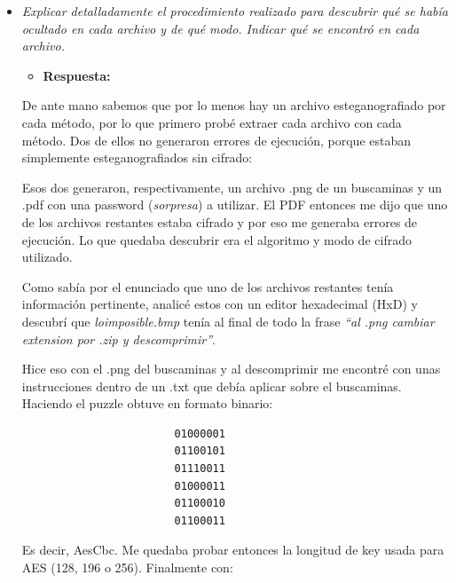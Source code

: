 \documentclass[a4paper,12pt]{article}
\begin{document}
	\begin{itemize}

		\item \textit{Explicar detalladamente el procedimiento realizado para descubrir qué se había ocultado en cada archivo y de qué modo. Indicar qué se encontró en cada archivo.}
		\begin{itemize}
			\item \textbf{Respuesta:} 
		\end{itemize}
	
		De ante mano sabemos que por lo menos hay un archivo esteganografiado por cada método, por lo que primero probé extraer cada archivo con cada método. Dos de ellos no generaron errores de ejecución, porque estaban simplemente esteganografiados sin cifrado:
		
		
		
		Esos dos generaron, respectivamente, un archivo .png de un buscaminas y un .pdf con una password (\textit{sorpresa}) a utilizar. El PDF entonces me dijo que uno de los archivos restantes estaba cifrado y por eso me generaba errores de ejecución. Lo que quedaba descubrir era el algoritmo y modo de cifrado utilizado. 
		
		Como sabía por el enunciado que uno de los archivos restantes tenía información pertinente, analicé estos con un editor hexadecimal (HxD) y descubrí que \textit{loimposible.bmp} tenía al final de todo la frase \textit{``al .png cambiar extension por .zip y descomprimir''}.
		
		Hice eso con el .png del buscaminas y al descomprimir me encontré con unas instrucciones dentro de un .txt que debía aplicar sobre el buscaminas. Haciendo el puzzle obtuve en formato binario:
		
		\begin{center}
				\begin{varwidth}{\linewidth}
					\begin{verbatim}
						01000001
						01100101
						01110011
						01000011
						01100010
						01100011
					\end{verbatim}
				\end{varwidth}
		\end{center}
	
		Es decir, AesCbc. Me quedaba probar entonces la longitud de key usada para AES (128, 196 o 256). Finalmente con:
		

\end{itemize}
\end{document}
